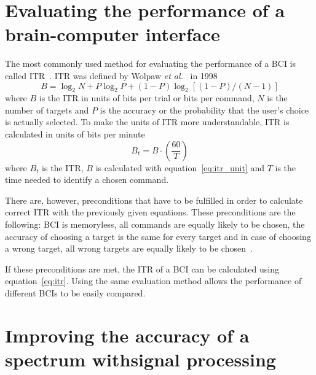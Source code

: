 
\section{Evaluating the performance of a brain-computer interface}

The most commonly used method for evaluating the performance of a \gls{BCI} is called \gls{ITR}~\cite{itr}. \gls{ITR} was defined by Wolpaw \textit{et al.}~\cite{itr_wolpaw} in 1998
\begin{equation}
	\label{eq:itr_unit}
	B=\log_2 N+ P\log_2 P +(1-P)\log_2[(1-P)/(N-1)]
\end{equation}
where $B$ is the \gls{ITR} in units of bits per trial or bits per command, $N$ is the number of targets and $P$ is the accuracy or the probability that the user's choice is actually selected. To make the units of \gls{ITR} more understandable, \gls{ITR} is calculated in units of bits per minute~\cite{itr_wolpaw}
\begin{equation}
	\label{eq:itr}
	B_t=B\cdot(\frac{60}{T})
\end{equation}
where $B_t$ is the \gls{ITR}, $B$ is calculated with equation~\ref{eq:itr_unit} and $T$ is the time needed to identify a chosen command.

There are, however, preconditions that have to be fulfilled in order to calculate correct \gls{ITR} with the previously given equations. These preconditions are the following: \gls{BCI} is memoryless, all commands are equally likely to be chosen, the accuracy of choosing a target is the same for every target and in case of choosing a wrong target, all wrong targets are equally likely to be chosen~\cite{itr}.

If these preconditions are met, the \gls{ITR} of a \gls{BCI} can be calculated using equation~\ref{eq:itr}. Using the same evaluation method allows the performance of different \glspl{BCI} to be easily compared.

\section[Improving the accuracy of a spectrum with signal processing]{Improving the accuracy of a spectrum with\break signal processing}
\label{sec:signal_processing}

